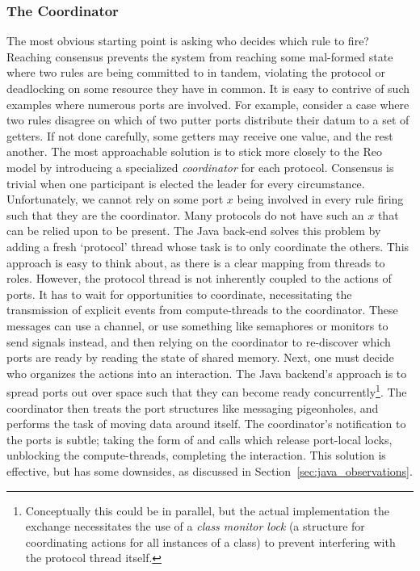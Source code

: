 \subsubsection{The Coordinator}
The most obvious starting point is asking who decides which rule to fire? Reaching consensus prevents the system from reaching some mal-formed state where two rules are being committed to in tandem, violating the protocol or deadlocking on some resource they have in common. It is easy to contrive of such examples where numerous ports are involved. For example, consider a case where two rules disagree on which of two putter ports distribute their datum to a set of getters. If not done carefully, some getters may receive one value, and the rest another. The most approachable solution is to stick more closely to the Reo model by introducing a specialized \textit{coordinator} for each protocol. Consensus is trivial when one participant is elected the leader for every circumstance. Unfortunately, we cannot rely on some port $x$ being involved in every rule firing such that they are the coordinator. Many protocols do not have such an $x$ that can be relied upon to be present. The Java back-end solves this problem by adding a fresh `protocol' thread whose task is to only coordinate the others. This approach is easy to think about, as there is a clear mapping from threads to roles. However, the protocol thread is not inherently coupled to the actions of ports. It has to wait for opportunities to coordinate, necessitating the transmission of explicit events from compute-threads to the coordinator. These messages can use a channel, or use something like semaphores or monitors to send signals instead, and then relying on the coordinator to re-discover which ports are ready by reading the state of shared memory. Next, one must decide who organizes the actions into an interaction. The Java backend's approach is to spread ports out over space such that they can become ready concurrently\footnote{Conceptually this could be in parallel, but the actual implementation the exchange necessitates the use of a \textit{class monitor lock} (a structure for coordinating actions for all instances of a class) to prevent interfering with the protocol thread itself.}. The coordinator then treats the port structures like messaging pigeonholes, and performs the task of moving data around itself. The coordinator's notification to the ports is subtle; taking the form of  and  calls which release port-local locks, unblocking the compute-threads, completing the interaction. This solution is effective, but has some downsides, as discussed in Section~\ref{sec:java_observations}. 

